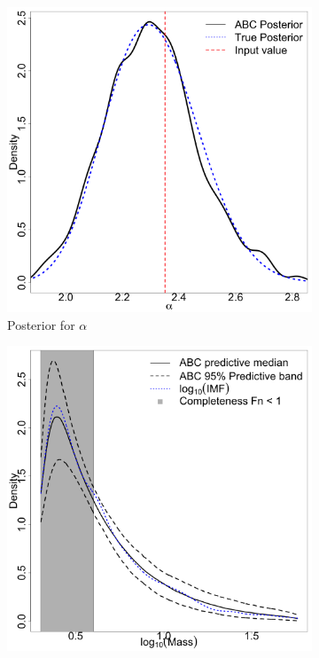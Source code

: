 \documentclass[ejs]{imsart}
\numberwithin{equation}{section}
\theoremstyle{plain}
\begin{document}
\begin{figure}[htbp]
\begin{subfigure}{0.32\textwidth}
\centering
\includegraphics[width=\textwidth]{figures/basic_1_1000_alpha.png}
\caption{Posterior for $\alpha$}\label{subfig:basic_alpha}
\end{subfigure}
\begin{subfigure}{0.32\textwidth}
\centering
\includegraphics[width=\textwidth]{figures/basic_1_1000_predictive_imf.png}

\end{subfigure}
\end{figure}
\end{document}
